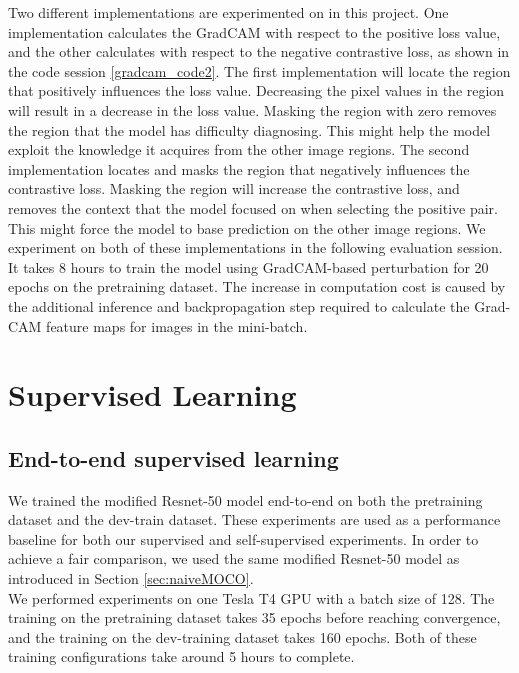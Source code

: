 \documentclass[12pt,twoside]{report}
\begin{document}
Two different implementations are experimented on in this project. One implementation calculates the GradCAM with respect to the positive loss value, and the other calculates with respect to the negative contrastive loss, as shown in the code session \ref{gradcam_code2}. The first implementation will locate the region that positively influences the loss value. Decreasing the pixel values in the region will result in a decrease in the loss value. Masking the region with zero removes the region that the model has difficulty diagnosing. This might help the model exploit the knowledge it acquires from the other image regions. The second implementation locates and masks the region that negatively influences the contrastive loss. Masking the region will increase the contrastive loss, and removes the context that the model focused on when selecting the positive pair. This might force the model to base prediction on the other image regions. We experiment on both of these implementations in the following evaluation session. \\

It takes 8 hours to train the model using GradCAM-based perturbation for 20 epochs on the pretraining dataset. The increase in computation cost is caused by the additional inference and backpropagation step required to calculate the Grad-CAM feature maps for images in the mini-batch. 

\section{Supervised Learning}
\subsection{End-to-end supervised learning} \label{sec:naive_supervised}
We trained the modified Resnet-50 model end-to-end on both the pretraining dataset and the dev-train dataset. These experiments are used as a performance baseline for both our supervised and self-supervised experiments. In order to achieve a fair comparison, we used the same modified Resnet-50 model as introduced in Section \ref{sec:naiveMOCO}. \\

We performed experiments on one Tesla T4 GPU with a batch size of 128. The training on the pretraining dataset takes 35 epochs before reaching convergence, and the training on the dev-training dataset takes 160 epochs. Both of these training configurations take around 5 hours to complete. 
\end{document}
